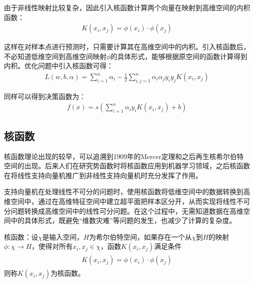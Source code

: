 由于非线性映射比较复杂，因此引入核函数计算两个向量在映射到高维空间的内积函数：
\begin{eqnarray}
K(x_{i},x_{j})=\phi(x_{i})\cdot\phi(x_{j})
\end{eqnarray}

这样在对样本点进行预测时，只需要计算其在高维空间中的内积。引入核函数后，不必知道低维空间到高维空间映射$\phi$的具体形式，能够根据原空间的函数计算得到内积。优化问题中引入核函数可得：
\begin{eqnarray}
L(w,b,\alpha)=\sum^{n}_{i=1}\alpha_{i}-\frac{1}{2}\sum^{n}_{i,j=1}\alpha_{i}\alpha_{j}y_{i}y_{j}K(x_{i},x_{j})
\end{eqnarray}

同样可以得到决策函数为：
\begin{eqnarray}
f(x)=s(\sum^{n}_{i=1}\alpha_{i}y_{i}K(x_{i},x_{j})+b)
\end{eqnarray}

\subsection{核函数}

核函数理论出现的较早，可以追溯到1909年的Mercer定理和之后再生核希尔伯特空间的出现。后来人们在研究势函数时将核函数应用到机器学习领域，之后核函数在将线性支持向量机推广到非线性支持向量机时充分发挥了作用。

支持向量机在处理线性不可分的问题时，使用核函数将低维空间中的数据转换到高维空间中，通过在高维特征空间中建立超平面把样本区分开，从而实现将线性不可分问题转换成高维空间中的线性可分问题。在这个过程中，无需知道数据在高维空间中的具体形式，既避免“维数灾难”等问题的发生，也减少了计算的复杂度。

\begin{definition}
核函数：设$\chi$是输入空间，$H$为希尔伯特空间，如果存在一个从$\chi$到$H$的映射$\phi:\chi\to H$，使得对所有$x_{i},x_{j}\in \chi$，函数$K(x_{i},x_{j})$满足条件
\begin{gather*}
\begin{split}
K(x_{i},x_{j})=\phi(x_{i})\cdot\phi(x_{j})
\end{split}
\end{gather*}
则称$K(x_{i},x_{j})$为核函数。
\end{definition}


